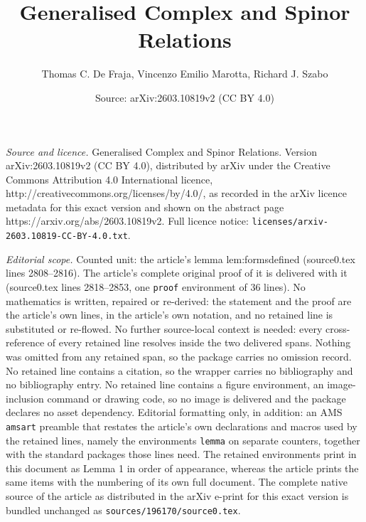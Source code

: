 \documentclass[10pt,a4paper]{amsart}
\title{Generalised Complex and Spinor Relations}
\author{Thomas C. De Fraja, Vincenzo Emilio Marotta, Richard J. Szabo}
\date{Source: arXiv:2603.10819v2 (CC BY 4.0)}
\begin{document}
\maketitle

\noindent\emph{Source and licence.} Generalised Complex and Spinor Relations. Version arXiv:2603.10819v2 (CC BY 4.0), distributed by arXiv under the Creative Commons Attribution 4.0 International licence, http://creativecommons.org/licenses/by/4.0/, as recorded in the arXiv licence metadata for this exact version and shown on the abstract page https://arxiv.org/abs/2603.10819v2. Full licence notice: \texttt{licenses/arxiv-2603.10819-CC-BY-4.0.txt}.\par\smallskip

\noindent\textit{Editorial scope.} Counted unit: the article's lemma lem:formsdefined (source0.tex lines 2808--2816). The article's complete original proof of it is delivered with it (source0.tex lines 2818--2853, one \texttt{proof} environment of 36 lines). No mathematics is written, repaired or re-derived: the statement and the proof are the article's own lines, in the article's own notation, and no retained line is substituted or re-flowed.  No further source-local context is needed: every cross-reference of every retained line resolves inside the two delivered spans.  Nothing was omitted from any retained span, so the package carries no omission record.  No retained line contains a citation, so the wrapper carries no bibliography and no bibliography entry.  No retained line contains a figure environment, an image-inclusion command or drawing code, so no image is delivered and the package declares no asset dependency.  Editorial formatting only, in addition: an AMS \texttt{amsart} preamble that restates the article's own declarations and macros used by the retained lines, namely the environments \texttt{lemma} on separate counters, together with the standard packages those lines need.  The retained environments print in this document as Lemma 1 in order of appearance, whereas the article prints the same items with the numbering of its own full document.  The complete native source of the article as distributed in the arXiv e-print for this exact version is bundled unchanged as \texttt{sources/196170/source0.tex}.
\end{document}
